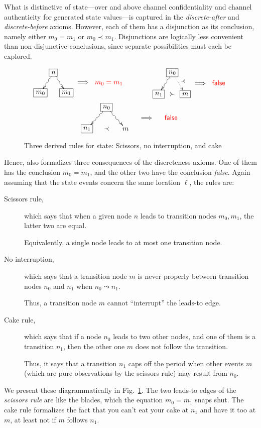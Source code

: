 What is distinctive of state---over and above channel confidentiality
and channel authenticity for generated state values---is captured in
the \emph{discrete-after} and \emph{discrete-before} axioms.  However,
each of them has a disjunction as its conclusion, namely either
$m_0=m_1$ or $m_0\prec m_1$.  Disjunctions are logically less
convenient than non-disjunctive conclusions, since separate
possibilities must each be explored.
%
\begin{figure}
  \centering\[ \xymatrix@R=1mm@C=1mm{&
      *+[F]{n}\ar@{~>}[ddl]\ar@{~>}[ddr] & \\
      & & & \Longrightarrow &  \textcolor{red}{m_0=m_1}  \\
      *+[F]{m_0} & & *+[F]{m_1}} \qquad\qquad
    \xymatrix@R=1mm@C=1mm{&
      *+[F]{n_0}\ar@{~>}[ddl]\ar@{.>}[ddr]^{\prec} & \\
      & & & \Longrightarrow &  \textcolor{red}{\mathsf{false}}  \\
      *+[F]{n_1} &\succ & *+[F]{m}}
  \]
  \[ \xymatrix@R=1mm@C=4mm{&
      *+[F]{n_0}\ar@{~>}[ddl]\ar@{~>}[ddr] & \\
      & & & \Longrightarrow &  \textcolor{red}{\mathsf{false}}  \\
      *+[F]{n_1} &\prec & {m}}
  \]  
  \caption{Three derived rules for state:  Scissors, no interruption,
    and cake}
  \label{fig:derived:state:rules}
\end{figure}
%
Hence, {\cpsa} also formalizes three consequences of the discreteness
axioms.  One of them has the conclusion $m_0=m_1$, and the other two
have the conclusion \emph {false}.  Again assuming that the state
events concern the same location $\ell$, the rules are:
%
\begin{description}
  \item[Scissors rule,] which says that when a given node $n$ leads to
  transition nodes $m_0,m_1$, the latter two are equal.

  Equivalently, a single node leads to at most one transition node.
  \item[No interruption,] which says that a transition node $m$ is
  never properly between transition nodes $n_0$ and $n_1$ when
  $n_0\leadsto n_1$.

  Thus, a transition node $m$ cannot ``interrupt'' the leads-to edge.
  \item[Cake rule,] which says that if a node $n_0$ leads to two other
  nodes, and one of them is a transition $n_1$, then the other one $m$
  does not follow the transition.

  Thus, it says that a transition $n_1$ caps off the period when other
  events $m$ (which are pure observations by the scissors rule) may
  result from $n_0$.  
\end{description}
%
We present these diagrammatically in
Fig.~\ref{fig:derived:state:rules}.  The two leads-to edges of the
\emph{scissors rule} are like the blades, which the equation
${m_0=m_1}$ snaps shut.  The cake rule formalizes the fact that you
can't eat your cake at $n_1$ and have it too at $m$, at least not if
$m$ follows $n_1$.

